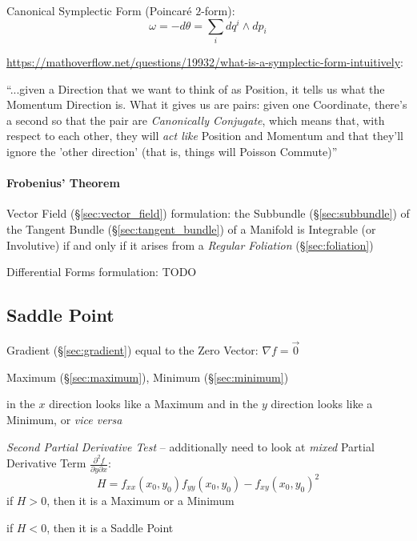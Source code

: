 Canonical Symplectic Form (Poincar\'e $2$-form):
\[
  \omega = -d\theta = \sum_i dq^i \wedge dp_i
\]

\url{https://mathoverflow.net/questions/19932/what-is-a-symplectic-form-intuitively}:

``...given a Direction that we want to think of as Position, it tells us what
the Momentum Direction is. What it gives us are pairs: given one Coordinate,
there's a second so that the pair are \emph{Canonically Conjugate}, which means
that, with respect to each other, they will \emph{act like} Position and
Momentum and that they'll ignore the 'other direction' (that is, things will
Poisson Commute)''



\paragraph{Frobenius' Theorem}\label{sec:frobenius_theorem}\hfill

Vector Field (\S\ref{sec:vector_field}) formulation:
the Subbundle (\S\ref{sec:subbundle}) of the Tangent Bundle
(\S\ref{sec:tangent_bundle}) of a Manifold is Integrable (or Involutive) if and
only if it arises from a \emph{Regular Foliation} (\S\ref{sec:foliation})

Differential Forms formulation: TODO



\subsection{Saddle Point}\label{sec:saddle_point}

Gradient (\S\ref{sec:gradient}) equal to the Zero Vector: $\nabla{f} = \vec{0}$

Maximum (\S\ref{sec:maximum}), Minimum (\S\ref{sec:minimum})

in the $x$ direction looks like a Maximum and in the $y$ direction looks like a
Minimum, or \emph{vice versa}

\emph{Second Partial Derivative Test} -- additionally need to look at
\emph{mixed} Partial Derivative Term
$\frac{\partial^2{f}}{\partial{y}\partial{x}}$:
\[
  H = f_{xx}(x_0,y_0)f_{yy}(x_0,y_0) - f_{xy}(x_0,y_0)^2
\]
if $H > 0$, then it is a Maximum or a Minimum

if $H < 0$, then it is a Saddle Point

